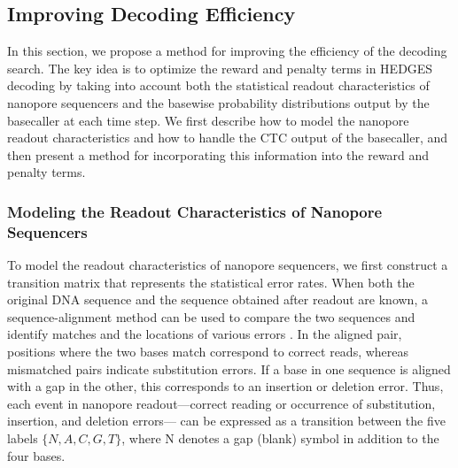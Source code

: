\documentclass[sotsuron]{kuee}
\begin{document}
\subsection{Improving Decoding Efficiency} \label{optimization}
In this section, we propose a method for improving the efficiency of the decoding search.
The key idea is to optimize the reward and penalty terms in HEDGES decoding by taking into account both the
statistical readout characteristics of nanopore sequencers and the basewise probability distributions
output by the basecaller at each time step.
We first describe how to model the nanopore readout characteristics and how to handle the CTC output of the
basecaller, and then present a method for incorporating this information into the reward and penalty terms.

\subsubsection{Modeling the Readout Characteristics of Nanopore Sequencers} \label{stat_model}
To model the readout characteristics of nanopore sequencers, we first construct a transition matrix that
represents the statistical error rates.
When both the original DNA sequence and the sequence obtained after readout are known, a sequence-alignment
method can be used to compare the two sequences and identify matches and the locations of various errors
\cite{GOTOH1982705}.
In the aligned pair, positions where the two bases match correspond to correct reads, whereas mismatched
pairs indicate substitution errors.
If a base in one sequence is aligned with a gap in the other, this corresponds to an insertion or deletion error.
Thus, each event in nanopore readout---correct reading or occurrence of substitution, insertion, and deletion errors---
can be expressed as a transition between the five labels $\{N, A, C, G, T\}$, where N denotes a gap (blank) symbol
in addition to the four bases.
\end{document}
